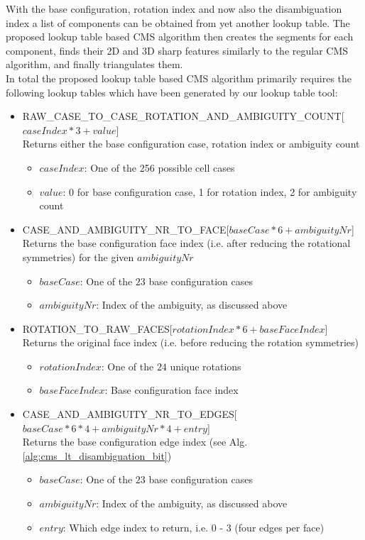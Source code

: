 With the base configuration, rotation index and now also the disambiguation index a list of components can be obtained from yet another lookup table. The proposed lookup table based CMS algorithm then creates the segments for each
component, finds their 2D and 3D sharp features similarly to the regular CMS algorithm, and finally triangulates them.\\
In total the proposed lookup table based CMS algorithm primarily requires the following lookup tables which have been generated by our lookup table tool:
\begin{itemize}

	\item RAW\_CASE\_TO\_CASE\_ROTATION\_AND\_AMBIGUITY\_COUNT[$caseIndex * 3 + value$]\\
	Returns either the base configuration case, rotation index or ambiguity count
	\begin{itemize}
		\item $caseIndex$: One of the 256 possible cell cases
		\item $value$: 0 for base configuration case, 1 for rotation index, 2 for ambiguity count
  \end{itemize}
	
	\item CASE\_AND\_AMBIGUITY\_NR\_TO\_FACE[$baseCase * 6 + ambiguityNr$]\\
	Returns the base configuration face index (i.e. after reducing the rotational symmetries) for the given $ambiguityNr$
	\begin{itemize}
		\item $baseCase$: One of the $23$ base configuration cases
		\item $ambiguityNr$: Index of the ambiguity, as discussed above
  \end{itemize}
	
	\item ROTATION\_TO\_RAW\_FACES[$rotationIndex * 6 + baseFaceIndex$]\\
	Returns the original face index (i.e. before reducing the rotation symmetries)
	\begin{itemize}
		\item $rotationIndex$: One of the $24$ unique rotations
		\item $baseFaceIndex$: Base configuration face index
  \end{itemize}
		
	\item CASE\_AND\_AMBIGUITY\_NR\_TO\_EDGES[$baseCase * 6 * 4 + ambiguityNr * 4 + entry$]\\
	Returns the base configuration edge index (see Alg. \ref{alg:cms_lt_disambiguation_bit})
	\begin{itemize}
		\item $baseCase$: One of the $23$ base configuration cases
		\item $ambiguityNr$: Index of the ambiguity, as discussed above
		\item $entry$: Which edge index to return, i.e. 0 - 3 (four edges per face)
  \end{itemize}
	

\end{itemize}
